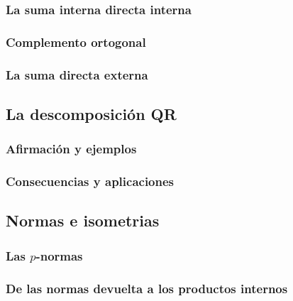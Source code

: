 \subsubsection{La suma interna directa interna} %
\label{ssub:la_suma_interna_directa_interna}

\subsubsection{Complemento ortogonal} %
\label{ssub:complemento_ortogonal}

\subsubsection{La suma directa externa} %
\label{ssub:la_suma_directa_externa}

\subsection{La descomposición QR} %
\label{sub:la_descomposicion_qr}

\subsubsection{Afirmación y ejemplos} %
\label{ssub:afirmacion_y_ejemplos}

\subsubsection{Consecuencias y aplicaciones} %
\label{ssub:consecuencias_y_aplicaciones}

\subsection{Normas e isometrias} %
\label{sub:normas_e_isometrias}

\subsubsection{Las \(p\)-normas} %
\label{ssub:las_p_normas}

\subsubsection{De las normas devuelta a los productos internos} %
\label{ssub:de_las_normas_devuelta_a_los_productos_internos}

